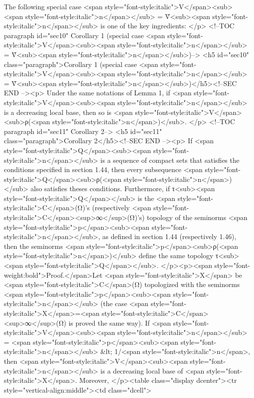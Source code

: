 {{{{The following special case 
<span style="font-style:italic">V</span><sub><span style="font-style:italic">n</span></sub> = Ṽ<sub><span style="font-style:italic">n</span></sub> 
is one of the key ingredients:
</p>
<!--TOC paragraph id="sec10" Corollary 1 (special case <span style="font-style:italic">V</span><sub><span style="font-style:italic">n</span></sub> = Ṽ<sub><span style="font-style:italic">n</span></sub>)-->
<h5 id="sec10" class="paragraph">Corollary 1 (special case <span style="font-style:italic">V</span><sub><span style="font-style:italic">n</span></sub> = Ṽ<sub><span style="font-style:italic">n</span></sub>)</h5><!--SEC END --><p>
Under the same notations of Lemma 1, if {<span style="font-style:italic">V</span><sub><span style="font-style:italic">n</span></sub>} is a decreasing 
local base, then so is {<span style="font-style:italic">V</span><sub>ρ(<span style="font-style:italic">n</span>)</sub>}.
</p>
<!--TOC paragraph id="sec11" Corollary 2-->
<h5 id="sec11" class="paragraph">Corollary 2</h5><!--SEC END --><p>
If 
{<span style="font-style:italic">Q</span><sub><span style="font-style:italic">n</span></sub>} 
is a sequence of compact sets that satisfies the conditions specified 
in section 1.44, then every subsequence 
{<span style="font-style:italic">Q</span><sub>ρ(<span style="font-style:italic">n</span>)</sub>} 
also satisfies theses conditions.
Furthermore, if τ<sub><span style="font-style:italic">Q</span></sub> is the <span style="font-style:italic">C</span>(Ω)’s 
(respectively <span style="font-style:italic">C</span><sup>∞</sup>(Ω)’s) topology of the seminorms <span style="font-style:italic">p</span><sub><span style="font-style:italic">n</span></sub>, 
as defined in section 1.44 (respectively 1.46), then the seminorms 
<span style="font-style:italic">p</span><sub>ρ(<span style="font-style:italic">n</span>)</sub> 
define the same topology τ<sub><span style="font-style:italic">Q</span></sub>.
</p><p><span style="font-weight:bold">Proof.</span>Let <span style="font-style:italic">X</span> be <span style="font-style:italic">C</span>(Ω) topologized with the seminorms <span style="font-style:italic">p</span><sub><span style="font-style:italic">n</span></sub> 
(the case <span style="font-style:italic">X</span>=<span style="font-style:italic">C</span><sup>∞</sup>(Ω) is proved the same way).
If 
<span style="font-style:italic">V</span><sub><span style="font-style:italic">n</span></sub> = {<span style="font-style:italic">p</span><sub><span style="font-style:italic">n</span></sub> &lt; 1/<span style="font-style:italic">n</span>}, 
then 
{<span style="font-style:italic">V</span><sub><span style="font-style:italic">n</span></sub>} 
is a decreasing local base of <span style="font-style:italic">X</span>.
Moreover,
</p><table class="display dcenter"><tr style="vertical-align:middle"><td class="dcell">
     

}}}}
